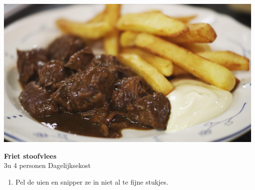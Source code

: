 \documentclass{article}
\newcommand{\recipesection}[1]{
    \LARGE\textcolor{darkcol}{\textbf{#1}}
}
\newcommand{\preparationitem}[1]{
    \normalsize\item{#1}
}
\newcommand{\recipetext}[1]{
    \textcolor{darkcol}{#1}
}
\begin{document}
\setlength{\columnsep}{2.2em}
\setlength{\columnseprule}{4pt}
\begin{paracol}{2}
\begin{leftcolumn}

\begin{center}
\includegraphics[width=\linewidth]{frietstoofvlees.jpg}%
\end{center}
\recipesection{Friet stoofvlees} %
\vspace{0pt}
\\
\textcolor{darkcol}{\normalsize\faClockO\recipetext
{3u} %
}
\textcolor{darkcol}{\normalsize\faUser\recipetext
{4 personen} %
}
\textcolor{darkcol}{\normalsize\faNewspaperO\recipetext
{Dagelijksekost} %
}
\vspace{5pt}
\begin{enumerate}[wide, labelwidth=!, labelindent=0pt]
        \preparationitem{Pel de uien en snipper ze in niet al te fijne stukjes.} %
        

\end{enumerate}
\end{leftcolumn}
\end{paracol}
\end{document}

